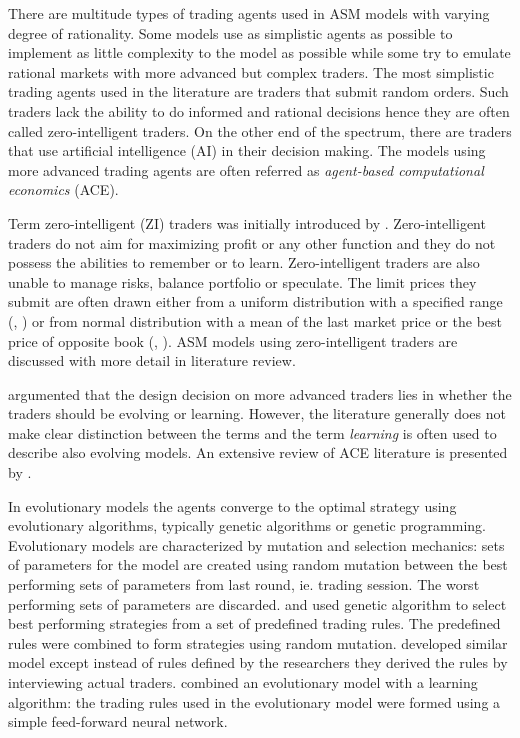 There are multitude types of trading agents used in ASM models with varying degree
of rationality. Some models use as simplistic agents as possible to implement as
little complexity to the model as possible while some try to emulate rational 
markets with more advanced but complex traders. The most simplistic trading agents
used in the literature are traders that submit random orders. Such traders
lack the ability to do informed and rational decisions hence they are often called
zero-intelligent traders. On the other end of the spectrum, there are traders
that use artificial intelligence (AI) in their decision making. The models using
more advanced trading agents are often referred as \emph{agent-based computational
economics} (ACE).

Term zero-intelligent (ZI) traders was initially introduced by \citet{God93}. Zero-intelligent
traders do not aim for maximizing profit or any other function and they do not 
possess the abilities to remember or to learn. Zero-intelligent traders are also unable
to manage risks, balance portfolio or speculate. The limit prices they submit are
often drawn either from a uniform distribution with a specified range (\citet{God93}, \citet{Mil08}) 
or from normal distribution with a mean of the last market price or the
best price of opposite book (\citet{LIU20082535}, \citet{Genoa01}). ASM models using
zero-intelligent traders are discussed with more detail in literature review. 

\citet{LeBranon2000} argumented that the design decision on more advanced traders 
lies in whether the traders should be evolving or learning. However, the literature
generally does not make clear distinction between the terms and the term \emph{learning}
is often used to describe also evolving models. An extensive review of ACE literature 
is presented by \citet{ACE12}.

In evolutionary models the agents converge to the optimal strategy using evolutionary algorithms, typically
genetic algorithms or genetic programming. Evolutionary models are characterized by 
mutation and selection mechanics: sets of parameters for the model are created 
using random mutation between the best performing sets of parameters from last 
round, ie. trading session. The worst performing sets of parameters are discarded.
\citet{GenAlgASM18} and \citet{GenAlgBTCASM19} used genetic algorithm to select 
best performing strategies from a set of predefined trading rules. The predefined
rules were combined to form strategies using random mutation. \citet{FieldGA05} developed
similar model except instead of rules defined by the researchers they derived the rules 
by interviewing actual traders. \citet{LeBranon2001} combined an evolutionary model with a 
learning algorithm: the trading rules used in the evolutionary model were formed using a 
simple feed-forward neural network.

